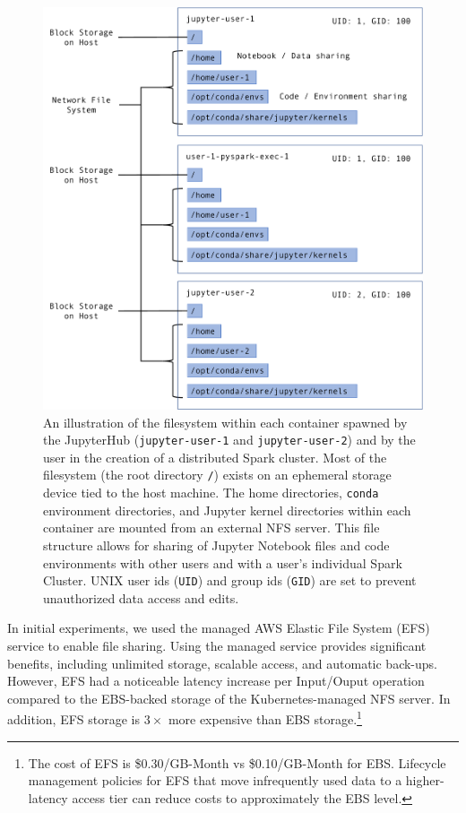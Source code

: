 \documentclass[twocolumn, linenumbers]{aastex631}
\begin{document}
\begin{figure}
    \centering
    \includegraphics[width=\linewidth]{pod_storage.pdf}
    \caption{An illustration of the filesystem within each  container spawned by the JupyterHub (\texttt{jupyter-user-1} and \texttt{jupyter-user-2}) and by the user in the creation of a distributed Spark cluster. Most of the filesystem (the root directory \texttt{/}) exists on an ephemeral storage device tied to the host machine. The home directories, \texttt{conda} environment directories, and Jupyter kernel directories within each container are mounted from an external NFS server. This file structure allows for sharing of Jupyter Notebook files and code environments with other users and with a user's individual Spark Cluster. UNIX user ids (\texttt{UID}) and group ids (\texttt{GID}) are set to prevent unauthorized data access and edits.
    }
    \label{fig:nfs_mounts}
\end{figure}

In initial experiments, we used the managed AWS Elastic File System (EFS) service to enable file sharing. Using the managed service provides significant benefits, including unlimited storage, scalable access, and automatic back-ups. However, EFS had a noticeable latency increase per Input/Ouput operation compared to the EBS-backed storage of the Kubernetes-managed NFS server. In addition, EFS storage is $3\times$ more expensive than EBS storage.\footnote{The cost of EFS is \$0.30/GB-Month vs \$0.10/GB-Month for EBS. Lifecycle management policies for EFS that move infrequently used data to a higher-latency access tier can reduce costs to approximately the EBS level.}
\end{document}
